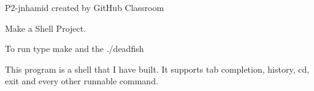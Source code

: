 P2-\/jnhamid created by Git\+Hub Classroom

Make a Shell Project.

To run type make and the ./deadfish

This program is a shell that I have built. It supports tab completion, history, cd, exit and every other runnable command. 